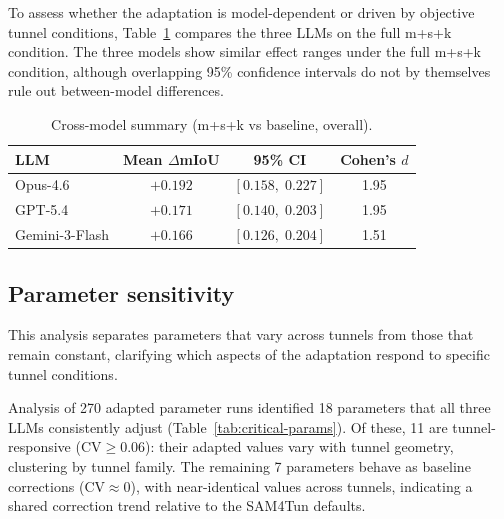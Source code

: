 \documentclass[a4paper,fleqn]{cas-dc}
\begin{document}
{To assess whether the adaptation is model-dependent or driven by objective tunnel conditions, Table~\ref{tab:cross-model} compares the three LLMs on the full m+s+k condition. The three models show similar effect ranges under the full m+s+k condition, although overlapping 95\% confidence intervals do not by themselves rule out between-model differences.

\begin{table}[ht]
\caption{Cross-model summary (m+s+k vs baseline, overall).}\label{tab:cross-model}
\begin{tabular*}{\tblwidth}{@{} l c c c @{}}
\toprule
LLM & Mean $\Delta$mIoU & 95\% CI & Cohen's $d$ \\
\midrule
Opus-4.6 & $+0.192$ & $[0.158,\; 0.227]$ & 1.95 \\
GPT-5.4 & $+0.171$ & $[0.140,\; 0.203]$ & 1.95 \\
Gemini-3-Flash & $+0.166$ & $[0.126,\; 0.204]$ & 1.51 \\
\bottomrule
\end{tabular*}
\end{table}

\subsection{Parameter sensitivity}\label{sec:sensitivity}

This analysis separates parameters that vary across tunnels from those that remain constant, clarifying which aspects of the adaptation respond to specific tunnel conditions.

Analysis of 270 adapted parameter runs identified 18 parameters that all three LLMs consistently adjust (Table~\ref{tab:critical-params}). Of these, 11 are tunnel-responsive ($\text{CV} \geq 0.06$): their adapted values vary with tunnel geometry, clustering by tunnel family. The remaining 7 parameters behave as baseline corrections ($\text{CV} \approx 0$), with near-identical values across tunnels, indicating a shared correction trend relative to the SAM4Tun defaults.

}
\end{document}
